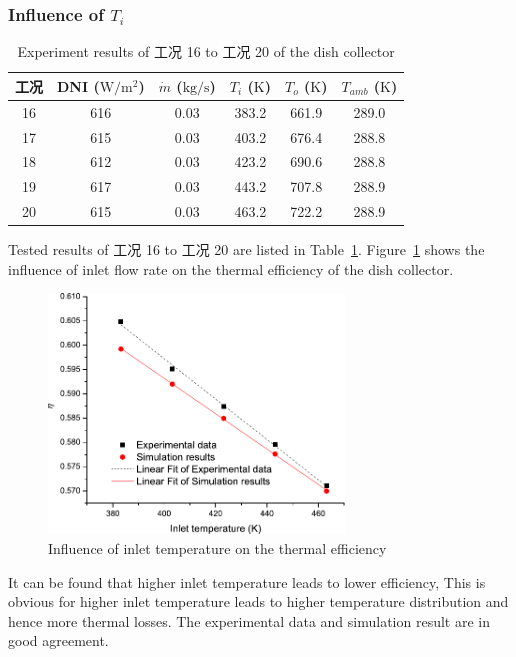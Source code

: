 \subsubsection{Influence of $T_i$}

\begin{table}[htbp]\footnotesize
	\caption{Experiment results of 工况 16 to 工况 20 of the dish collector}
	\begin{center}
	\begin{tabular}{cccccc}
		\toprule
		工况	& DNI ($\mathrm{W/m^2}$)	&	$\dot{m}$ ($\mathrm{kg/s}$)			&	$T_i$ ($\mathrm{K}$)	&	$T_o$ ($\mathrm{K}$)		&	$T_{amb}$ ($\mathrm{K}$)\\
		\midrule
		16	&	616	&	0.03	&	383.2	&	661.9	&	289.0\\
		17	&	615	&	0.03	&	403.2	&	676.4	&	288.8\\
		18	&	612	&	0.03	&	423.2	&	690.6	&	288.8	\\
		19	&	617	&	0.03	&	443.2	&	707.8	&	288.9\\
		20	&	615	&	0.03	&	463.2	&	722.2	&	288.9\\
		\bottomrule
	\end{tabular}
	\end{center}
	\label{tab:ResultOfDish3}
\end{table}
Tested results of 工况 16 to 工况 20 are listed in Table~\ref{tab:ResultOfDish3}.
Figure~\ref{fig:T_i-eta-dish} shows the influence of inlet flow rate on the thermal efficiency of the dish collector.
\begin{figure}[!ht]
\centering
\includegraphics[width=0.7\textwidth]{fig/T_i-eta-dish}
\caption{Influence of inlet temperature on the thermal efficiency}
\label{fig:T_i-eta-dish}
\end{figure}

It can be found that higher inlet temperature leads to lower efficiency, This is obvious for higher inlet temperature leads to higher temperature distribution and hence more thermal losses. The experimental data and simulation result are in good agreement.

